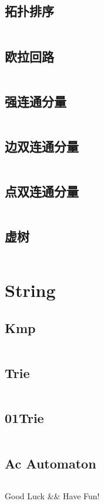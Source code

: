 \documentclass[titlepage, a4paper]{article}
\begin{document}
\begin{multicols}{2}
\begin{spacing}{0.6}
			 	\subsection{拓扑排序}
			 		\inputminted{cpp}{src/Graph/Topo_sort.cpp}
			 	\subsection{欧拉回路}
			 		\inputminted{cpp}{src/Graph/Euler_path.cpp}
			 	\subsection{强连通分量}
			 		\inputminted{cpp}{src/Graph/Tarjan_scc.cpp}
			 	\subsection{边双连通分量}
			 		\inputminted{cpp}{src/Graph/Tarjan_edcc.cpp}
			 	\subsection{点双连通分量}
			 		\inputminted{cpp}{src/Graph/Tarjan_vdcc.cpp}
			 	\subsection{虚树}
			 		\inputminted{cpp}{src/Graph/Virtual_tree.cpp}
			 \section{String}
			 	\subsection{Kmp}
			 		\inputminted{cpp}{src/String/Kmp.cpp}
			 	\subsection{Trie}
			 		\inputminted{cpp}{src/String/Trie.cpp}
			 	\subsection{01Trie}
			 		\inputminted{cpp}{src/String/01_trie.cpp}
			 	\subsection{Ac Automaton}
			 		\inputminted{cpp}{src/String/Ac_automaton.cpp}
		\end{spacing}
			\endgroup
	\end{multicols}
	
	\begin{center}
		\LARGE{Good Luck \&\& Have Fun!}
	\end{center}
		
	
\end{document}
